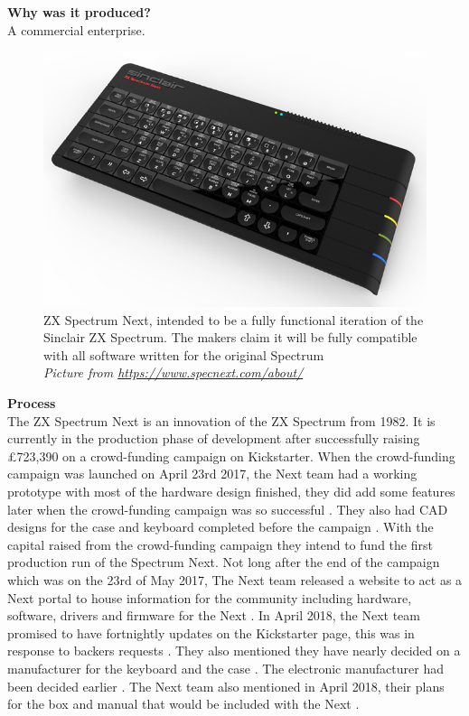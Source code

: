 \textbf{Why was it produced?}\\
A commercial enterprise.

\begin{figure} \begin{center}
\includegraphics[width=.3\linewidth]{pics/spectrum_next} 
\end{center} 
\caption{ZX Spectrum Next, intended to be a fully functional iteration of the Sinclair ZX Spectrum. The makers claim it will be fully compatible with all software written for the original Spectrum \\ \textit{\small{Picture from \url {https://www.specnext.com/about/}}}}
\label{Spectrum_Next}
\end{figure} 

\textbf{Process}\\
The ZX Spectrum Next is an innovation of the ZX Spectrum from 1982. It is currently in the production phase of development after successfully raising \pounds 723,390 on a crowd-funding campaign on Kickstarter. When the crowd-funding campaign was launched on April 23rd 2017, the Next team had a working prototype with most of the hardware design finished, they did add some features later when the crowd-funding campaign was so successful 
\cite{RN151}. They also had CAD designs for the case and keyboard completed before the campaign 
\cite{RN149}. With the capital raised from the crowd-funding campaign they intend to fund the first production run of the Spectrum Next. Not long after the end of the campaign which was on the 23rd of May 2017, The Next team released a website to act as a Next portal to house information for the community including hardware, software, drivers and firmware for the Next 
\cite{RN154}. In April 2018, the Next team promised to have fortnightly updates on the Kickstarter page, this was in response to backers requests 
\cite{RN155}. They also mentioned they have nearly decided on a manufacturer for the keyboard and the case 
\cite{RN155}. The electronic manufacturer had been decided earlier 
\cite{RN151}. The Next team also mentioned in April 2018, their plans for the box and manual that would be included with the Next 
\cite{RN151}.\\

